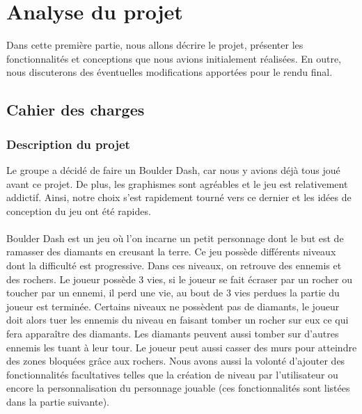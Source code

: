 \section{Analyse du projet}
    Dans cette première partie, nous allons décrire le projet, présenter les fonctionnalités et conceptions que nous avions initialement réalisées. En outre, nous discuterons des éventuelles modifications apportées pour le rendu final.
    
    \subsection{Cahier des charges}
        \subsubsection{Description du projet}
        Le groupe a décidé de faire un Boulder Dash, car nous y avions déjà tous joué avant ce projet. De plus, les graphismes sont agréables et le jeu est relativement addictif. Ainsi, notre choix s'est rapidement tourné vers ce dernier et les idées de conception du jeu ont été rapides. 
        \\
        \\
        Boulder Dash est un jeu où l'on incarne un petit personnage dont le but est de ramasser des diamants en creusant la terre. 
        Ce jeu possède différents niveaux dont la difficulté est progressive. Dans ces niveaux, on retrouve des ennemis et des rochers. 
        Le joueur possède 3 vies, si le joueur se fait écraser par un rocher ou toucher par un ennemi, il perd une vie, au bout de 3 vies perdues la partie du joueur est terminée. Certains niveaux ne possèdent pas de diamants, le joueur doit alors tuer les ennemis du niveau en faisant tomber un rocher sur eux ce qui fera apparaître des diamants. Les diamants peuvent aussi tomber sur d'autres ennemis les tuant à leur tour. Le joueur peut aussi casser des murs pour atteindre des zones bloquées grâce aux rochers.
        Nous avons aussi la volonté d’ajouter des fonctionnalités facultatives telles que la création de niveau par l’utilisateur ou encore la personnalisation du personnage jouable (ces fonctionnalités sont listées dans la partie suivante).

